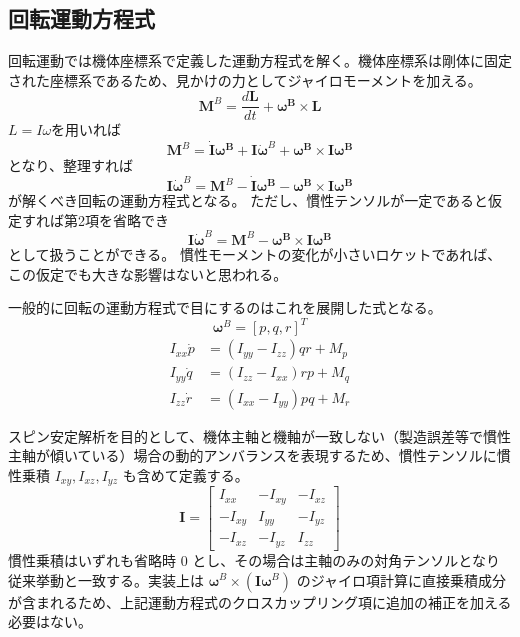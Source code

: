 ﻿\documentclass[a4paper]{jsarticle}
\begin{document}
\subsection{回転運動方程式}
回転運動では機体座標系で定義した運動方程式を解く。機体座標系は剛体に固定された座標系であるため、見かけの力としてジャイロモーメントを加える。
\begin{equation}
\bm{M}^B = \frac{d\bm{L}}{dt} + \bm{\omega^B} \times \bm{L}
\end{equation}
$L = I \omega$を用いれば
\begin{equation}
\bm{M}^B = 
\dot{\bm{I}} \bm{\omega^B}
+ \bm{I} \dot{\bm{\omega}}^B
+ \bm{\omega^B} \times \bm{I} \bm{\omega^B}
\end{equation}
となり、整理すれば
\begin{equation}
\bm{I} \dot{\bm{\omega}}^B = 
\bm{M}^B
- \dot{\bm{I}} \bm{\omega^B}
- \bm{\omega^B} \times \bm{I} \bm{\omega^B}
\end{equation}
が解くべき回転の運動方程式となる。
ただし、慣性テンソルが一定であると仮定すれば第2項を省略でき
\begin{equation}
\bm{I} \dot{\bm{\omega}}^B = 
\bm{M}^B
- \bm{\omega^B} \times \bm{I} \bm{\omega^B}
\end{equation}
として扱うことができる。
慣性モーメントの変化が小さいロケットであれば、この仮定でも大きな影響はないと思われる。

一般的に回転の運動方程式で目にするのはこれを展開した式となる。
\begin{equation}
\bm{\omega}^B = [p, q, r]^T
\end{equation}
\begin{eqnarray}
I_{xx} \dot{p} &= (I_{yy}-I_{zz})qr+M_p \\
I_{yy} \dot{q} &= (I_{zz}-I_{xx})rp+M_q \\
I_{zz} \dot{r} &= (I_{xx}-I_{yy})pq+M_r
\end{eqnarray}

スピン安定解析を目的として、機体主軸と機軸が一致しない（製造誤差等で慣性主軸が傾いている）場合の動的アンバランスを表現するため、慣性テンソルに慣性乗積 $I_{xy}, I_{xz}, I_{yz}$ も含めて定義する。
\begin{equation}
\bm{I} =
\begin{bmatrix}
 I_{xx} & -I_{xy} & -I_{xz} \\
-I_{xy} &  I_{yy} & -I_{yz} \\
-I_{xz} & -I_{yz} &  I_{zz}
\end{bmatrix}
\end{equation}
慣性乗積はいずれも省略時 0 とし、その場合は主軸のみの対角テンソルとなり従来挙動と一致する。実装上は $\bm{\omega}^B \times (\bm{I} \bm{\omega}^B)$ のジャイロ項計算に直接乗積成分が含まれるため、上記運動方程式のクロスカップリング項に追加の補正を加える必要はない。
\end{document}
